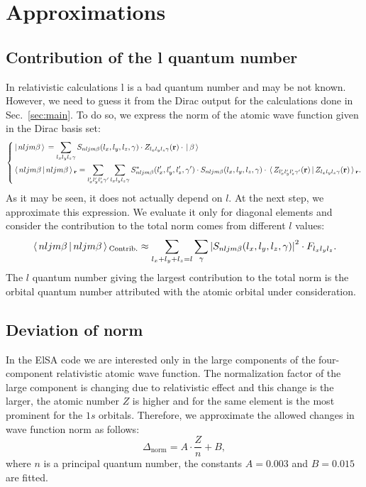 \documentclass[12pt,openright,twoside,headsepline,bibtotoc]{scrbook}
\begin{document}
\section{Approximations}

\subsection{Contribution of the l quantum number}

In relativistic calculations l is a bad quantum number and may be not known. However, we need to guess it from the Dirac output for the calculations done in Sec.~\ref{sec:main}. To do so, we express the norm of the atomic wave function given in the Dirac basis set:
%
\begin{equation}
\left\{
\begin{aligned}
&\,| \, n l j m \beta \, \rangle\, = \sum_{l_x l_y l_z \gamma} S_{n l j m \beta}(l_x, l_y, l_z, \gamma) \cdot Z_{l_x l_y l_z \gamma}(\mathbf{r}) \cdot \,| \, \beta \, \rangle\,
\\
&\,\langle \, n l j m \beta \, | \, n l j m \beta \, \rangle\,_{\mathbf{r}} = \sum_{l_x^\prime l_y^\prime l_z^\prime \gamma^\prime} \sum_{l_x l_y l_z \gamma} S_{n l j m \beta}^\ast(l_x^\prime, l_y^\prime, l_z^\prime, \gamma^\prime) \cdot S_{n l j m \beta}(l_x, l_y, l_z, \gamma) \cdot \,\langle \, Z_{l_x^\prime l_y^\prime l_z^\prime \gamma^\prime}(\mathbf{r}) \, | \, Z_{l_x l_y l_z \gamma}(\mathbf{r}) \, \rangle\,_{\mathbf{r}} .
\end{aligned}
\right.
\end{equation}
%
As it may be seen, it does not actually depend on $l$. At the next step, we approximate this expression. We evaluate it only for diagonal elements and consider the contribution to the total norm comes from different $l$ values:
%
\begin{equation}
\,\langle \, n l j m \beta \, | \, n l j m \beta \, \rangle\,_\textrm{Contrib.} \approx \sum_{l_x+l_y+l_z = l} \sum_\gamma \left| S_{n l j m \beta}(l_x, l_y, l_z, \gamma) \right|^2 \cdot F_{l_x l_y l_z} .
\end{equation}
%
The $l$ quantum number giving the largest contribution to the total norm is the orbital quantum number attributed with the atomic orbital under consideration.

\subsection{Deviation of norm}

In the ElSA code we are interested only in the large components of the four-component relativistic atomic wave function. The normalization factor of the large component is changing due to relativistic effect and this change is the larger, the atomic number $Z$ is higher and for the same element is the most prominent for the $1s$ orbitals. Therefore, we approximate the allowed changes in wave function norm as follows:
%
\begin{equation}
\Delta_\textrm{norm} = A \cdot \frac{Z}{n} + B,
\end{equation}
%
where $n$ is a principal quantum number, the constants $A = 0.003$ and $B = 0.015$ are fitted.
\end{document}

